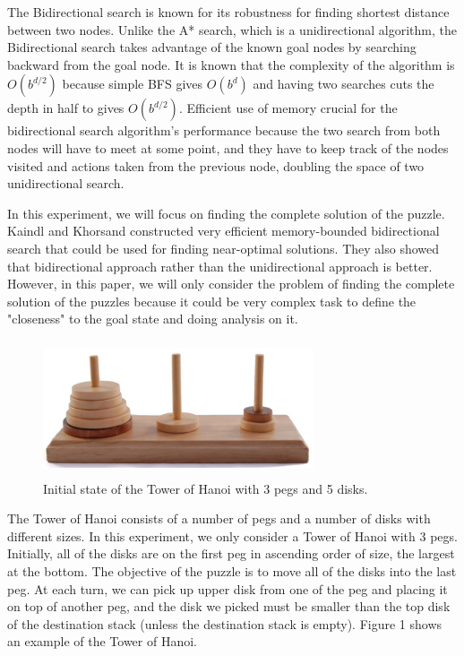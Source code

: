 \documentclass[conference]{IEEEtran}
\begin{document}
The Bidirectional search is known for its robustness for finding shortest distance between two nodes. Unlike the A* search, which is a unidirectional algorithm, the Bidirectional search takes advantage of the known goal nodes by searching backward from the goal node. It is known that the complexity of the algorithm is $O(b^{d/2})$ because simple BFS gives $O(b^d)$ and having two searches cuts the depth in half to gives $O(b^{d/2})$. Efficient use of memory crucial for the bidirectional search algorithm's performance because the two search from both nodes will have to meet at some point, and they have to keep track of the nodes visited and actions taken from the previous node, doubling the space of two unidirectional search.

In this experiment, we will focus on finding the complete solution of the puzzle. Kaindl and Khorsand constructed very efficient memory-bounded bidirectional search that could be used for finding near-optimal solutions. They also showed that bidirectional approach rather than the unidirectional approach is better. \cite{KandKh} However, in this paper, we will only consider the problem of finding the complete solution of the puzzles because it could be very complex task to define the "closeness" to the goal state and doing analysis on it.

\begin{figure}[!t]
\includegraphics[width=8cm, height=4cm]{towerofhanoi}
\centering
\caption{Initial state of the Tower of Hanoi with 3 pegs and 5 disks.}
\end{figure}

The Tower of Hanoi consists of a number of pegs and a number of disks with different sizes. In this experiment, we only consider a Tower of Hanoi with 3 pegs. Initially, all of the disks are on the first peg in ascending order of size, the largest at the bottom. The objective of the puzzle is to move all of the disks into the last peg. At each turn, we can pick up upper disk from one of the peg and placing it on top of another peg, and the disk we picked must be smaller than the top disk of the destination stack (unless the destination stack is empty). Figure 1 shows an example of the Tower of Hanoi.
\end{document}
